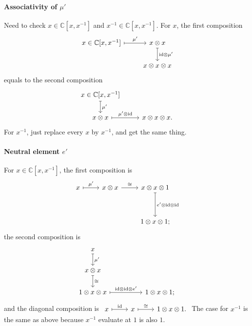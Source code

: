 \documentclass{article}
\theoremstyle{definition}
\newcommand{\tensor}[2]{#1\otimes#2}
\newcommand{\id}{\mathrm{id}}
\begin{document}
\paragraph{Associativity of $\mu'$} Need to check $x\in\mathbb C[x,x^{-1}]$ and $x^{-1}\in\mathbb C[x,x^{-1}]$. For $x$, the first composition
$$
\begin{tikzcd}
{x \in \mathbb C[x, x^{-1}]} \arrow[r, mapsto, "\mu'"] & {\tensor x x} \arrow[d, mapsto, "{\tensor\id{\mu'}}"] \\
& {\tensor{\tensor x x}{x}}
\end{tikzcd}
$$ equals to the second composition
$$
\begin{tikzcd}
{x\in\mathbb C[x,x^{-1}]}\arrow[d,mapsto, "\mu'"] \\
{\tensor x x}\arrow[r, mapsto, "\tensor{\mu'}{\id}"] & \tensor{x}{\tensor x x}.
\end{tikzcd}
$$ For $x^{-1}$, just replace every $x$ by $x^{-1}$, and get the same thing.

\paragraph{Neutral element $e'$} For $x\in\mathbb C[x, x^{-1}]$, the first composition is
$$
\begin{tikzcd}
x \arrow[r, mapsto, "\mu'"] & {\tensor x x} \arrow[r, "\cong"] & \tensor{x}{\tensor x 1}\arrow[dd, mapsto, "{\tensor{e'}{\tensor \id \id}}"] \\
\\
& & \tensor1{\tensor x 1};
\end{tikzcd}
$$ the second composition is
$$
\begin{tikzcd}
x \arrow[d, mapsto, "\mu'"] \\
{\tensor x x}\arrow[d, mapsto, "\cong"] \\
\tensor1{\tensor x x}\arrow[rr,mapsto, "\tensor{\id}{\tensor\id{e'}}"] & & \tensor1{\tensor x 1};
\end{tikzcd}
$$ and the diagonal composition is
$
\begin{tikzcd}
x\arrow[r, mapsto, "\id"]
& x\arrow[r, mapsto, "\cong"]
& \tensor1{\tensor x 1}.
\end{tikzcd}
$ The case for $x^{-1}$ is the same as above because $x^{-1}$ evaluate at $1$ is also $1$.
\end{document}
